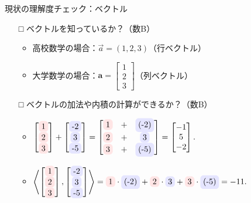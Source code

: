 \documentclass[dvipdfmx,aspectratio=169]{beamer}
\newcommand{\highlight}[2][yellow]{\tikz[baseline=(x.base)]{\node[rectangle,rounded corners,fill=#1!10](x){#2};}}
\begin{document}
	\begin{frame}{現状の理解度チェック：ベクトル}
		\begin{itemize}
			\item[□]
				ベクトルを知っているか？（数B）
				\begin{itemize}
					\item
						高校数学の場合：$ \overrightarrow{a} = (1,2,3) $（行ベクトル）
					\item
						大学数学の場合：$ \boldsymbol{a} = \begin{bmatrix}
							1\\ 2\\ 3
						\end{bmatrix} $（列ベクトル）
				\end{itemize}
			\item[□]
				ベクトルの加法や内積の計算ができるか？（数B）
				\begin{itemize}
					\item
						$ \begin{bmatrix}
							\highlight[red]{1}\\ \highlight[red]{2}\\ \highlight[red]{3}
						\end{bmatrix} + \begin{bmatrix}
							\highlight[blue]{-2}\\ \highlight[blue]{3}\\ \highlight[blue]{-5}
						\end{bmatrix} = \begin{bmatrix}
							\highlight[red]{1}&+&\highlight[blue]{(-2)}\\ \highlight[red]{2}&+&\highlight[blue]{3}\\ \highlight[red]{3}&+&\highlight[blue]{(-5)}
						\end{bmatrix} = \begin{bmatrix}
							-1\\ 5\\ -2
						\end{bmatrix}. $
					\item
						$ \left\langle \begin{bmatrix}
							\highlight[red]1\\ \highlight[red]2\\ \highlight[red]3
						\end{bmatrix}, \begin{bmatrix}
						\highlight[blue]{-2}\\ \highlight[blue]3\\ \highlight[blue]{-5}
					\end{bmatrix} \right\rangle = \highlight[red]1 \cdot \highlight[blue]{(-2)} + \highlight[red]2 \cdot \highlight[blue]3 + \highlight[red]3 \cdot \highlight[blue]{(-5)} = -11. $
				\end{itemize}
		\end{itemize}
	\end{frame}
\end{document}
